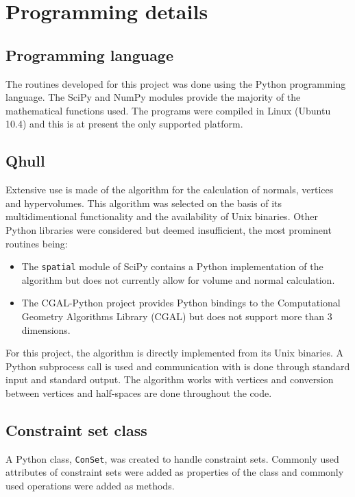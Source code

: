 \section{Programming details}

\subsection{Programming language}
The routines developed for this project was done using the Python programming language.
The SciPy and NumPy modules provide the majority of the mathematical functions used.
The programs were compiled in Linux (Ubuntu 10.4) and this is at present the only supported platform.

\subsection{Qhull}\label{sec:qhull}
Extensive use is made of the \qhull algorithm \citep{qhull} for the calculation of normals, vertices and hypervolumes.
This algorithm was selected on the basis of its multidimentional functionality and the availability of Unix binaries.
Other Python libraries were considered but deemed insufficient, the most prominent routines being:
\begin{itemize}
\item The \texttt{spatial} module of SciPy contains a Python implementation of the \qhull algorithm but does not currently allow for volume and normal calculation.
\item The CGAL-Python project \citep{cgal} provides Python bindings to the Computational Geometry Algorithms Library (CGAL) but does not support more than 3 dimensions.
\end{itemize}

For this project, the \qhull algorithm is directly implemented from its Unix binaries.
A Python subprocess call is used and communication with \qhull is done through standard input and standard output.
The \qhull algorithm works with vertices and conversion between vertices and half-spaces are done throughout the code.

\subsection{Constraint set class}
\label{sec:conclass}
A Python class, \texttt{ConSet}, was created to handle constraint sets.
Commonly used attributes of constraint sets were added as properties of the class and commonly used operations were added as methods.

